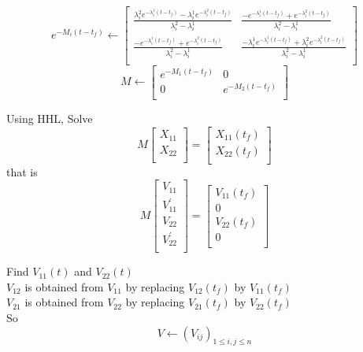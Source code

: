 \documentclass[12pt]{article}
\begin{document}
$$e^{-M_{i}(t-t_f)}\leftarrow\begin{bmatrix}
                            \frac{\lambda_i^2e^{-\lambda_i^1(t-t_f)}-\lambda_i^1e^{-\lambda_i^2(t-t_f)}}{\lambda_i^2-\lambda_i^1}& \frac{-e^{-\lambda_i^1(t-t_f)}+e^{-\lambda_i^2(t-t_f)}}{ \lambda_i^2-\lambda_i^1}\\
\frac{-e^{-\lambda_i^1(t-t_f)}+e^{-\lambda_i^2(t-t_f)}}{ \lambda_i^2-\lambda_i^1}&
\frac{-\lambda_i^1e^{-\lambda_i^1(t-t_f)}+\lambda_i^2e^{-\lambda_i^2(t-t_f)}}{\lambda_i^2-\lambda_i^1}\\
\end{bmatrix}
$$
$$M\leftarrow \begin{bmatrix}
                 e^{-M_1(t-t_f)}&0\\
                  0& e^{-M_2(t-t_f)}\\
                  \end{bmatrix}
$$

 Using HHL, Solve 
 $$M\begin{bmatrix}
     X_{11}\\
     X_{22}\\
 \end{bmatrix}
 =\begin{bmatrix}
     X_{11}(t_f)\\
     X_{22}(t_f)\\
 \end{bmatrix}$$
 that is $$M\begin{bmatrix}
     V_{11}\\
     V_{11}^{'}\\
     V_{22}\\
     V_{22}^{'}\\
     \end{bmatrix}
     =\begin{bmatrix}
V_{11}(t_f)\\
 0\\
 V_{22}(t_f)\\
   0\\
 \end{bmatrix}
     $$
     
 Find $V_{11}(t)$ and $V_{22}(t)$   \\
 $V_{12}$  is obtained from $V_{11}$ by replacing  $V_{12}(t_f)$  by $V_{11}(t_f)$\\
  $V_{21}$  is obtained from $V_{22}$ by replacing  $V_{21}(t_f)$  by $V_{22}(t_f)$\\

  So $$V\leftarrow(V_{ij})_{1\leq i,j \leq n} $$
\end{document}
